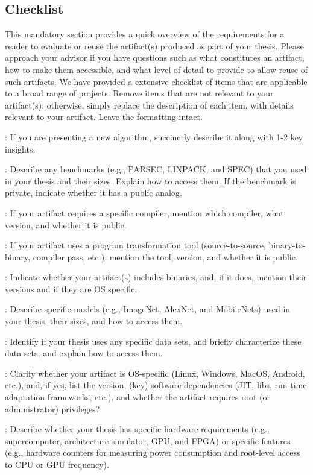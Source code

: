 \subsection{Checklist}

This mandatory section provides a quick overview of the requirements for a
reader to evaluate or reuse the artifact(s) produced as part of your thesis.
%
Please approach your advisor if you have questions such as what constitutes an
artifact, how to make them accessible, and what level of detail to provide to
allow reuse of such artifacts.
%
We have provided a extensive checklist of items that are applicable to a broad
range of projects.
%
Remove items that are not relevant to your artifact(s); otherwise, simply
replace the description of each item, with details relevant to your artifact.
%
Leave the formatting intact.

:
%
If you are presenting a new algorithm, succinctly describe it along with 1-2 key
insights.

:
%
Describe any benchmarks (e.g., PARSEC, LINPACK, and SPEC) that you used in your
thesis and their sizes.
%
Explain how to access them.
%
If the benchmark is private, indicate whether it has a public analog.

:
%
If your artifact requires a specific compiler, mention which compiler, what
version, and whether it is public.

:
%
If your artifact uses a program transformation tool (source-to-source,
binary-to-binary, compiler pass, etc.), mention the tool, version, and whether
it is public.

:
%
Indicate whether your artifact(s) includes binaries, and, if it does, mention
their versions and if they are OS specific.

:
%
Describe specific models (e.g., ImageNet, AlexNet, and MobileNets) used in your
thesis, their sizes, and how to access them.

:
%
Identify if your thesis uses any specific data sets, and briefly characterize
these data sets, and explain how to access them.

:
%
Clarify whether your artifact is OS-specific (Linux, Windows, MacOS, Android,
etc.), and, if yes, list the version, (key) software dependencies (JIT, libs,
run-time adaptation frameworks, etc.), and whether the artifact requires
root (or administrator) privileges?

:
%
Describe whether your thesis has specific hardware requirements (e.g.,
supercomputer, architecture simulator, GPU, and FPGA) or specific features
(e.g., hardware counters for measuring power consumption and root-level access
to CPU or GPU frequency).

